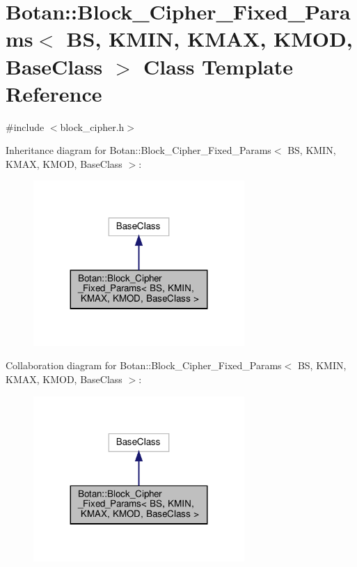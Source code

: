 \hypertarget{class_botan_1_1_block___cipher___fixed___params}{}\section{Botan\+:\+:Block\+\_\+\+Cipher\+\_\+\+Fixed\+\_\+\+Params$<$ BS, K\+M\+IN, K\+M\+AX, K\+M\+OD, Base\+Class $>$ Class Template Reference}
\label{class_botan_1_1_block___cipher___fixed___params}


{\ttfamily \#include $<$block\+\_\+cipher.\+h$>$}



Inheritance diagram for Botan\+:\+:Block\+\_\+\+Cipher\+\_\+\+Fixed\+\_\+\+Params$<$ BS, K\+M\+IN, K\+M\+AX, K\+M\+OD, Base\+Class $>$\+:
\nopagebreak
\begin{figure}[H]
\begin{center}
\leavevmode
\includegraphics[width=227pt]{class_botan_1_1_block___cipher___fixed___params__inherit__graph}
\end{center}
\end{figure}


Collaboration diagram for Botan\+:\+:Block\+\_\+\+Cipher\+\_\+\+Fixed\+\_\+\+Params$<$ BS, K\+M\+IN, K\+M\+AX, K\+M\+OD, Base\+Class $>$\+:
\nopagebreak
\begin{figure}[H]
\begin{center}
\leavevmode
\includegraphics[width=227pt]{class_botan_1_1_block___cipher___fixed___params__coll__graph}
\end{center}
\end{figure}
